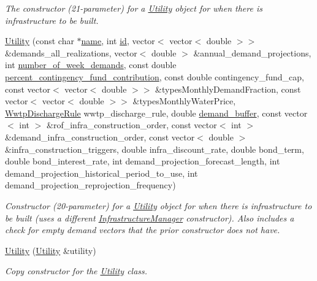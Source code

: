 \begin{DoxyCompactItemize}
\begin{DoxyCompactList}\small\item\em The constructor (21-\/parameter) for a \mbox{\hyperlink{classUtility}{Utility}} object for when there is infrastructure to be built. \end{DoxyCompactList}\item 
\mbox{\hyperlink{classUtility_ae590079ab073cb52a00cda7d921909c4}{Utility}} (const char $\ast$\mbox{\hyperlink{classUtility_ad0ce5c179a7f5ceb46d4fcae08dbfb47}{name}}, int \mbox{\hyperlink{classUtility_ad41c4ea5c911c5000452a3371cd65d5f}{id}}, vector$<$ vector$<$ double $>$$>$ \&demands\+\_\+all\+\_\+realizations, vector$<$ double $>$ \&annual\+\_\+demand\+\_\+projections, int \mbox{\hyperlink{classUtility_a0548db3746582251082aa430db49dad0}{number\+\_\+of\+\_\+week\+\_\+demands}}, const double \mbox{\hyperlink{classUtility_a7b1a097ec188be8e7175d058b5e6596c}{percent\+\_\+contingency\+\_\+fund\+\_\+contribution}}, const double contingency\+\_\+fund\+\_\+cap, const vector$<$ vector$<$ double $>$$>$ \&types\+Monthly\+Demand\+Fraction, const vector$<$ vector$<$ double $>$$>$ \&types\+Monthly\+Water\+Price, \mbox{\hyperlink{classWwtpDischargeRule}{Wwtp\+Discharge\+Rule}} wwtp\+\_\+discharge\+\_\+rule, double \mbox{\hyperlink{classUtility_a4be9760339ec06e5c932890da8e566b3}{demand\+\_\+buffer}}, const vector$<$ int $>$ \&rof\+\_\+infra\+\_\+construction\+\_\+order, const vector$<$ int $>$ \&demand\+\_\+infra\+\_\+construction\+\_\+order, const vector$<$ double $>$ \&infra\+\_\+construction\+\_\+triggers, double infra\+\_\+discount\+\_\+rate, double bond\+\_\+term, double bond\+\_\+interest\+\_\+rate, int demand\+\_\+projection\+\_\+forecast\+\_\+length, int demand\+\_\+projection\+\_\+historical\+\_\+period\+\_\+to\+\_\+use, int demand\+\_\+projection\+\_\+reprojection\+\_\+frequency)
\begin{DoxyCompactList}\small\item\em Constructor (20-\/parameter) for a \mbox{\hyperlink{classUtility}{Utility}} object for when there is infrastructure to be built (uses a different \mbox{\hyperlink{classInfrastructureManager}{Infrastructure\+Manager}} constructor). Also includes a check for empty demand vectors that the prior constructor does not have. \end{DoxyCompactList}\item 
\mbox{\hyperlink{classUtility_a44eaefb71f90fcf28143e3e919074a97}{Utility}} (\mbox{\hyperlink{classUtility}{Utility}} \&utility)
\begin{DoxyCompactList}\small\item\em Copy constructor for the \mbox{\hyperlink{classUtility}{Utility}} class. \end{DoxyCompactList}\item 
$$
\end{DoxyCompactItemize}
